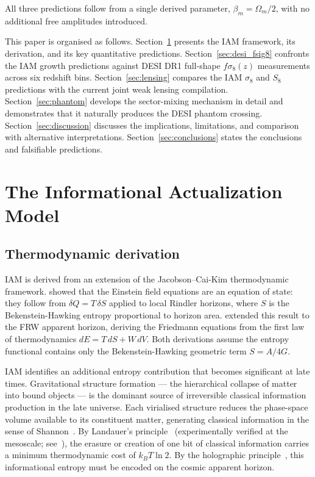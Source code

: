\documentclass[12pt,a4paper]{article}
\begin{document}
All three predictions follow from a single derived parameter, $\beta_m =
\Omega_m/2$, with no additional free amplitudes introduced.

This paper is organised as follows.
Section~\ref{sec:iam} presents the IAM framework, its derivation, and
its key quantitative predictions.
Section~\ref{sec:desi_fsig8} confronts the IAM growth predictions against
DESI DR1 full-shape $f\sigma_8(z)$ measurements across six redshift bins.
Section~\ref{sec:lensing} compares the IAM $\sigma_8$ and $S_8$ predictions
with the current joint weak lensing compilation.
Section~\ref{sec:phantom} develops the sector-mixing mechanism in detail
and demonstrates that it naturally produces the DESI phantom crossing.
Section~\ref{sec:discussion} discusses the implications, limitations, and
comparison with alternative interpretations.
Section~\ref{sec:conclusions} states the conclusions and falsifiable
predictions.


\section{The Informational Actualization Model}
\label{sec:iam}

\subsection{Thermodynamic derivation}
\label{sec:derivation}

IAM is derived from an extension of the Jacobson--Cai-Kim thermodynamic
framework.
\citet{Jacobson1995} showed that the Einstein field equations are an equation
of state: they follow from $\delta Q = T\,\delta S$ applied to local
Rindler horizons, where $S$ is the Bekenstein-Hawking entropy proportional
to horizon area.
\citet{CaiKim2005} extended this result to the FRW apparent horizon,
deriving the Friedmann equations from the first law of thermodynamics
$dE = T\,dS + W\,dV$.
Both derivations assume the entropy functional contains only the
Bekenstein-Hawking geometric term $S = A/4G$.

IAM identifies an additional entropy contribution that becomes significant
at late times.
Gravitational structure formation --- the hierarchical collapse of matter
into bound objects --- is the dominant source of irreversible classical
information production in the late universe.
Each virialised structure reduces the phase-space volume available to its
constituent matter, generating classical information in the sense of
Shannon~\citep{Shannon1948}.
By Landauer's principle~\citep{Landauer1961} (experimentally verified at
the mesoscale; see~\citealt{Berut2012}), the erasure or creation of one
bit of classical information carries a minimum thermodynamic cost of
$k_B T \ln 2$.
By the holographic principle~\citep{Bousso2002}, this informational entropy
must be encoded on the cosmic apparent horizon.
\end{document}
